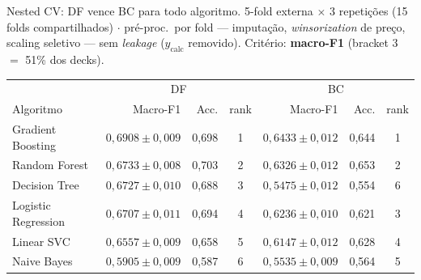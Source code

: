 \documentclass[aspectratio=149, dvipsnames]{beamer}
\begin{document}
\begin{frame}{Nested CV: DF vence BC para todo algoritmo.}\pause
    {\footnotesize 5-fold externa $\times$ 3 repetições (15 folds compartilhados) $\cdot$ pré-proc.\ por fold --- imputação, \textit{winsorization} de preço, scaling seletivo --- sem \textit{leakage} ($y_{\text{calc}}$ removido). Critério: \textbf{macro-F1} (bracket 3 $=$ 51\% dos decks).}
    \medskip
    \scriptsize
    \setlength{\tabcolsep}{4pt}
    \begin{center}
        \begin{tabular}{l|rrc|rrc}
            \toprule
            & \multicolumn{3}{c|}{DF} & \multicolumn{3}{c}{BC} \\
            Algoritmo & Macro-F1 & Acc. & rank & Macro-F1 & Acc. & rank \\
            \midrule
            Gradient Boosting   & $0{,}6908 \pm 0{,}009$ & 0{,}698 & 1 & $0{,}6433 \pm 0{,}012$ & 0{,}644 & 1 \\
            Random Forest       & $0{,}6733 \pm 0{,}008$ & 0{,}703 & 2 & $0{,}6326 \pm 0{,}012$ & 0{,}653 & 2 \\
            Decision Tree       & $0{,}6727 \pm 0{,}010$ & 0{,}688 & 3 & $0{,}5475 \pm 0{,}012$ & 0{,}554 & 6 \\
            Logistic Regression & $0{,}6707 \pm 0{,}011$ & 0{,}694 & 4 & $0{,}6236 \pm 0{,}010$ & 0{,}621 & 3 \\
            Linear SVC          & $0{,}6557 \pm 0{,}009$ & 0{,}658 & 5 & $0{,}6147 \pm 0{,}012$ & 0{,}628 & 4 \\
            Naive Bayes         & $0{,}5905 \pm 0{,}009$ & 0{,}587 & 6 & $0{,}5535 \pm 0{,}009$ & 0{,}564 & 5 \\
            \bottomrule
        \end{tabular}
    \end{center}
    \normalsize
    \vfill
    \medskip

\end{frame}
\end{document}
